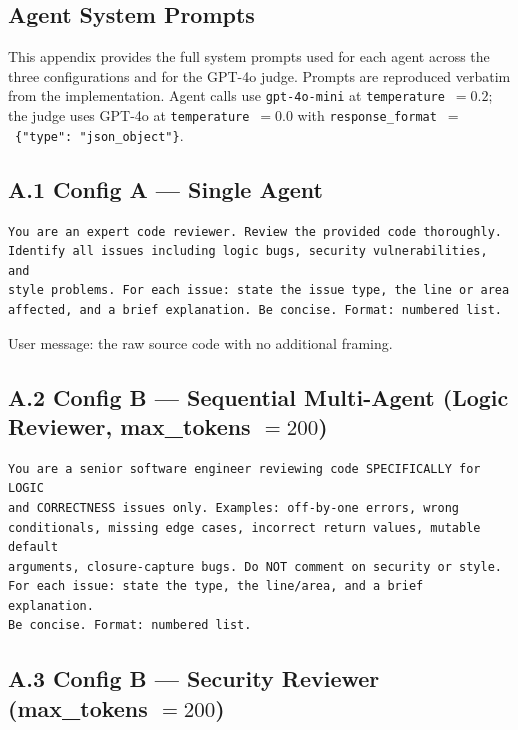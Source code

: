 \documentclass[pdflatex,sn-mathphys-num]{sn-jnl}
\theoremstyle{thmstyleone}
\theoremstyle{thmstyletwo}
\theoremstyle{thmstylethree}
\begin{document}
\begin{appendices}

\section{Agent System Prompts}\label{app:prompts}

This appendix provides the full system prompts used for each agent across the three configurations and for the GPT-4o judge. Prompts are reproduced verbatim from the implementation. Agent calls use \texttt{gpt-4o-mini} at \texttt{temperature}~$=0.2$; the judge uses GPT-4o at \texttt{temperature}~$=0.0$ with \texttt{response\_format}~$=$~\texttt{\{"type": "json\_object"\}}.

\subsection*{A.1 Config A --- Single Agent}

\begin{lstlisting}[style=promptstyle]
You are an expert code reviewer. Review the provided code thoroughly.
Identify all issues including logic bugs, security vulnerabilities, and
style problems. For each issue: state the issue type, the line or area
affected, and a brief explanation. Be concise. Format: numbered list.
\end{lstlisting}

User message: the raw source code with no additional framing.

\subsection*{A.2 Config B --- Sequential Multi-Agent (Logic Reviewer, max\_tokens $=200$)}

\begin{lstlisting}[style=promptstyle]
You are a senior software engineer reviewing code SPECIFICALLY for LOGIC
and CORRECTNESS issues only. Examples: off-by-one errors, wrong
conditionals, missing edge cases, incorrect return values, mutable default
arguments, closure-capture bugs. Do NOT comment on security or style.
For each issue: state the type, the line/area, and a brief explanation.
Be concise. Format: numbered list.
\end{lstlisting}

\subsection*{A.3 Config B --- Security Reviewer (max\_tokens $=200$)}


\end{appendices}
\end{document}
